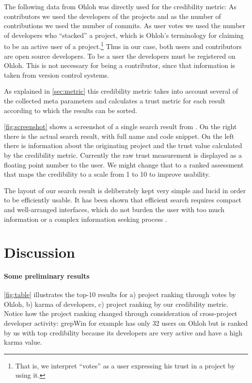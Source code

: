\documentclass[10pt]{book}
\begin{document}
The following data from Ohloh was directly used for the credibility metric: As contributors we used the developers of the projects and as the number of contributions we used the number of commits. As user votes we used the number of developers who ``stacked'' a project, which is Ohloh's terminology for claiming to be an active user of a project.\footnote{That is, we interpret ``votes'' as a user expressing his trust in a project by using it.} Thus in our case, both users and contributors are open source developers. To be a user the developers must be registered on Ohloh.  This is not necessary for being a contributor, since that information is taken from version control systems.

As explained in \autoref{sec:metric} this credibility metric takes into account several of the collected meta parameters and calculates a trust metric for each result according to which the results can be sorted.

\autoref{fig:screenshot} shows a screenshot of a single search result from \Jbd. On the right there is the actual search result, with full name and code snippet. On the left there is information about the originating project and the trust value calculated by the credibility metric. Currently the raw trust measurement is displayed as a floating point number to the user. We might change that to a ranked assessment that maps the credibility to a scale from 1 to 10 to improve usability. 

The layout of our search result is deliberately kept very simple and lucid in order to be efficiently usable. It has been shown that efficient search requires compact and well-arranged interfaces, which do not burden the user with too much information or a complex information seeking process \cite{Hear09a}. 


\section{Discussion}
\label{sec:discussion}

\paragraph{Some preliminary results}
\autoref{fig:table} illustrates the top-10 results for a) project ranking through votes by Ohloh, b) karma of developers, c) project ranking by our credibility metric. Notice how the project ranking changed through consideration of cross-project developer activity: grepWin for example has only 32 users on Ohloh but is ranked by us with top credibility because its developers are very active and have a high karma value.
\end{document}
